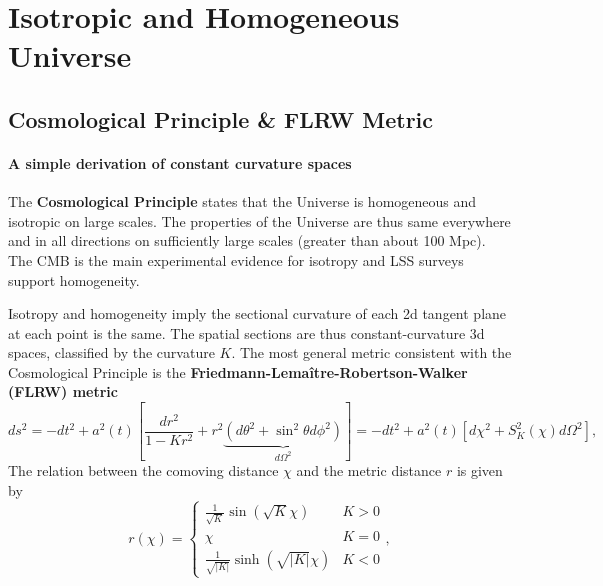 \chapter{Isotropic and Homogeneous Universe}


\section{Cosmological Principle \& FLRW Metric}

\subsubsection{A simple derivation of constant curvature spaces}


The \textbf{Cosmological Principle} states that the Universe is homogeneous and isotropic on large scales. The properties of the Universe are thus same everywhere and in all directions on sufficiently large scales (greater than about 100 Mpc).
The CMB is the main experimental evidence for isotropy and LSS surveys support homogeneity.


Isotropy and homogeneity imply the sectional curvature of each 2d tangent plane at each point is the same.
The spatial sections are thus constant-curvature 3d spaces, classified by the curvature $K$.
The most general metric consistent with the Cosmological Principle is the \textbf{Friedmann-Lemaître-Robertson-Walker (FLRW) metric}
\begin{equation}
    ds^2 = -dt^2 + a^2(t) \left[ \frac{dr^2}{1-Kr^2} + r^2 \underbrace{(d\theta^2 + \sin^2\theta d\phi^2)}_{d\Omega^2} \right]
    = -dt^2 + a^2(t) \left[ d\chi^2 + S_K^2(\chi) d\Omega^2 \right],
\end{equation}
The relation between the comoving distance $\chi$ and the metric distance $r$ is given by
\begin{equation}
    r(\chi) = \begin{cases}
        \frac{1}{\sqrt{K}} \sin(\sqrt{K}\chi) & K > 0 \\
        \chi & K = 0 \\
        \frac{1}{\sqrt{|K|}} \sinh(\sqrt{|K|}\chi) & K < 0
    \end{cases},
\end{equation}


